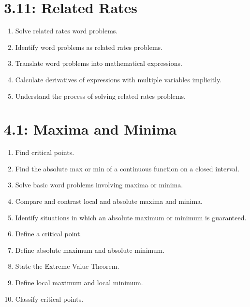 \documentclass[11pt]{article}
\begin{document}
\section*{3.11: Related Rates}
\begin{enumerate}
	\item Solve related rates word problems.
	\item Identify word problems as related rates problems.
	\item Translate word problems into mathematical expressions.
	\item Calculate derivatives of expressions with multiple variables implicitly.
	\item Understand the process of solving related rates problems.
\end{enumerate}

\section*{4.1: Maxima and Minima}
\begin{enumerate}
	\item Find critical points.
	\item Find the absolute max or min of a continuous function on a closed interval.
	\item Solve basic word problems involving maxima or minima.
	\item Compare and contrast local and absolute maxima and minima.
	\item Identify situations in which an absolute maximum or minimum is guaranteed.
	\item Define a critical point.
	\item Define absolute maximum and absolute minimum.
	\item State the Extreme Value Theorem.
	\item Define local maximum and local minimum.
	\item Classify critical points.
\end{enumerate}
\end{document}

